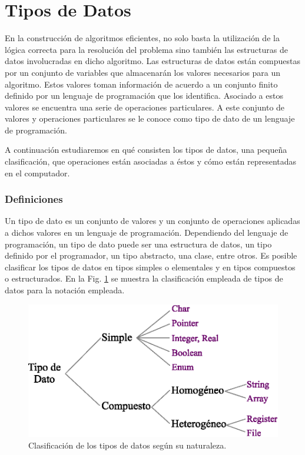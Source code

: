 \newpage
\part{Tipos de Datos}

En la construcción de algoritmos eficientes, no solo basta la utilización de la lógica correcta para la resolución del problema sino también las estructuras de datos involucradas en dicho algoritmo. Las estructuras de datos están compuestas por un conjunto de variables que almacenarán los valores necesarios para un algoritmo. Estos valores toman información de acuerdo a un conjunto finito definido por un lenguaje de programación que los identifica. Asociado a estos valores se encuentra una serie de operaciones particulares. A este conjunto de valores y operaciones particulares se le conoce como tipo de dato de un lenguaje de programación.

A continuación estudiaremos en qué consisten los tipos de datos, una pequeña clasificación, que operaciones están asociadas a éstos y cómo están representadas en el computador. 

\section{Definiciones}

Un tipo de dato es un conjunto de valores y un conjunto de operaciones aplicadas a dichos valores en un lenguaje de programación. Dependiendo del lenguaje de programación, un tipo de dato puede ser una estructura de datos, un tipo definido por el programador, un tipo abstracto, una clase, entre otros. Es posible clasificar los tipos de datos en tipos simples o elementales y en tipos compuestos o estructurados. En la Fig. \ref{fig:tipodato} se muestra la clasificación empleada de tipos de datos para la notación  empleada.

\begin{figure}[!htb]
\centering
\includegraphics[scale=.7]{images/tipoDeDato.eps}
\caption{Clasificación de los tipos de datos según su naturaleza.}
\label{fig:tipodato}
\end{figure}

